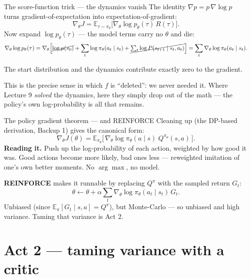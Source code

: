 \documentclass[10pt, aspectratio=169]{beamer}
\begin{document}
\begin{frame}{The score-function trick --- the dynamics vanish}
The identity $\nabla p = p\,\nabla\log p$ turns gradient-of-expectation into expectation-of-gradient:
\[
\nabla_\theta J = \mathbb{E}_{\tau\sim\pi_\theta}\big[\nabla_\theta\log p_\theta(\tau)\,R(\tau)\big].
\]
Now expand $\log p_\theta(\tau)$ --- the model terms carry no $\theta$ and die:
\[
\nabla_\theta \log p_\theta(\tau) = \nabla_\theta\Big[\cancel{\log\mu(s_0)} + \sum_t \log\pi_\theta(a_t\mid s_t) + \cancel{\textstyle\sum_t \log P(s_{t+1}\mid s_t,a_t)}\Big] = \sum_t \nabla_\theta\log\pi_\theta(a_t\mid s_t).
\]
\medskip

\pause
\begin{center}\large
\alert{The start distribution and the dynamics contribute exactly zero to the gradient.}
\end{center}
This is the precise sense in which $f$ is ``deleted'': we never needed it. Where Lecture 9 \emph{solved} the dynamics, here they simply drop out of the math --- the policy's own log-probability is all that remains.
\end{frame}

\begin{frame}{The policy gradient theorem --- and REINFORCE}
Cleaning up (the DP-based derivation, Backup 1) gives the canonical form:
\[
\nabla_\theta J(\theta) = \mathbb{E}_{\pi_\theta}\big[\,\nabla_\theta \log \pi_\theta(a\mid s)\; Q^{\pi_\theta}(s,a)\,\big].
\]
\textbf{Reading it.} Push up the log-probability of each action, \alert{weighted by how good it was}. Good actions become more likely, bad ones less --- reweighted imitation of one's own better moments. No $\arg\max$, no model.
\medskip

\pause
\textbf{REINFORCE} makes it runnable by replacing $Q^\pi$ with the sampled return $G_t$:
\[
\theta \leftarrow \theta + \alpha \sum_t \nabla_\theta \log\pi_\theta(a_t\mid s_t)\, G_t.
\]
Unbiased (since $\mathbb{E}_\pi[G_t\mid s,a]=Q^\pi$), but Monte-Carlo --- so \alert{unbiased and high variance}. Taming that variance is Act 2.
\end{frame}

\section{Act 2 --- taming variance with a critic}
\end{document}
